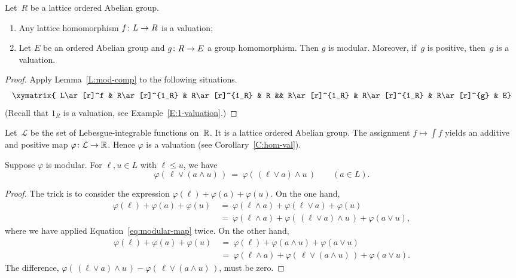\documentclass[main.tex]{subfiles}
\begin{document}
\begin{cor}
\label{C:hom-val}
Let~$R$ be a lattice ordered Abelian group.
\begin{enumerate}
\item
Any lattice homomorphism $f\colon L\rightarrow R$ 
is a valuation;

\item
Let $E$ be an ordered Abelian group
and $g\colon R\rightarrow E$ a group homomorphism.
Then $g$ is modular.
Moreover,
if~$g$ is positive,
then~$g$ is a valuation.
\end{enumerate}
\end{cor}
\begin{proof}
Apply Lemma~\ref{L:mod-comp} to the following situations.
\begin{equation*}
\xymatrix{
L\ar[r]^f &
R\ar[r]^{1_R} &
R\ar[r]^{1_R} &
R &&
R\ar[r]^{1_R} &
R\ar[r]^{1_R} &
R\ar[r]^{g} &
E}
\end{equation*}
(Recall that $1_R$ is a valuation,
see Example~\ref{E:1-valuation}.)
\end{proof}

\begin{ex}
Let~$\mathcal{L}$ be the set of Lebesgue-integrable functions on~$\mathbb{R}$.
It is a lattice ordered Abelian group.
The assignment $f\mapsto \int f$
yields an additive and positive map $\varphi\colon \mathcal{L}\rightarrow \mathbb{R}$.
Hence $\varphi$ is a valuation (see Corollary~\ref{C:hom-val}).
\end{ex}


%
%
\begin{lem}
\label{L:modular-map-modular}
Suppose $\varphi$ is modular.
For $\ell,u\in L$ with $\ell\leq u$, we have
\begin{equation}
\label{eq:modular-map}
\varphi(\,\ell \vee (a \wedge u)\,) 
\ =\ 
\varphi(\,(\ell\vee a)\wedge u\,)
\qquad (a\in L).
\end{equation}
\begin{proof}
The trick is to consider the expression 
$\varphi(\ell) + \varphi(a) + \varphi(u)$.
On the one hand,
\begin{align*}
\varphi(\ell) + \varphi(a) + \varphi(u)
\ &=\ \varphi(\ell\wedge a) + \varphi(\ell \vee a) + \varphi(u) \\
\ &=\ \varphi(\ell \wedge a)
      + \varphi(\,(\ell\vee a)\wedge u\,)
      + \varphi(a\vee u),
\end{align*}
where we have applied Equation~\eqref{eq:modular-map} twice.
On the other hand,
\begin{align*}
\varphi(\ell) + \varphi(a) + \varphi(u)
\ &=\ \varphi(\ell) + \varphi(a\wedge u) + \varphi(a \vee u) \\
\ &=\ \varphi(\ell \wedge a)
      + \varphi(\,\ell\vee (a\wedge u)\,)
      + \varphi(a\vee u).
\end{align*}
The difference,
$\varphi(\,(\ell\vee a)\wedge u\,)
- \varphi(\,\ell\vee (a\wedge u)\,)$,
must be zero.
\end{proof}
\end{lem}
\end{document}
